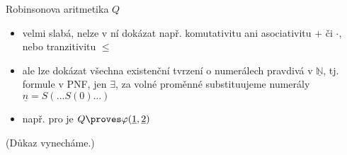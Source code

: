 \documentclass{beamer}
\begin{document}
\begin{frame}{Robinsonova aritmetika $Q$}    

    \pause
    
    \pause
    \begin{itemize}
        \item velmi slabá, nelze v ní dokázat např. komutativitu ani asociativitu $+$ či $\cdot$, nebo tranzitivitu $\leq$\pause
        \item ale lze dokázat všechna \alert{existenční tvrzení o numerálech} pravdivá v $\underline{\mathbb N}$, tj. formule v PNF, jen $\exists$, za volné proměnné substituujeme \alert{numerály} $\underline{n}=S(\dots S(0)\dots)$\pause
        \item např. pro  je $Q\proves\varphi(\underline{1},\underline{2})$
    \end{itemize}

    \medskip
    
    \pause

    (Důkaz vynecháme.)

\end{frame}
\end{document}
